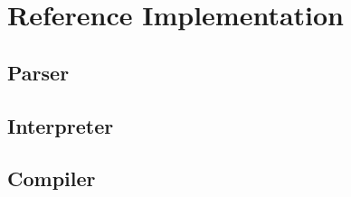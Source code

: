 \documentclass{article}
\begin{document}
    \section{Reference Implementation}\label{sec:implementation}

    \subsection{Parser}\label{subsec:parser}

    

    \subsection{Interpreter}\label{subsec:interpreter}

    

    \subsection{Compiler}\label{subsec:compiler}

    
\end{document}
